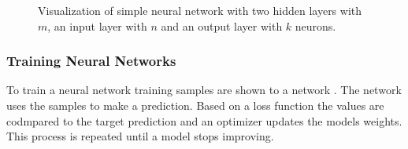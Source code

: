 \begin{figure}
    \centering
    \caption{Visualization of simple neural network with two hidden layers with $m$, an input layer with $n$ and an output layer with $k$ neurons.}
    \label{fig:Foundations:ANNs:Layer:FullyConnected}
\end{figure}

\subsubsection{Training Neural Networks}
\label{sec:Foundations:NeuralNetworks:Training}

To train a neural network training samples are shown to a network \cite{nielsen2015neural}. The network uses the samples to make a prediction. Based on a loss function the values are codmpared to the target prediction and an optimizer updates the models weights. This process is repeated until a model stops improving.


